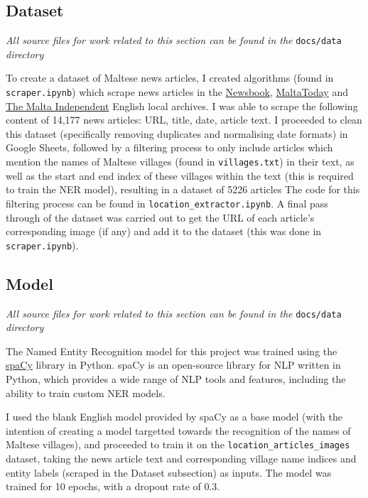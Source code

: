 \documentclass[a4paper, oneside, 11pt]{article}
\begin{document}
\begin{multicols*}{2}
  \subsection{Dataset}
  \textit{All source files for work related to this section can be found in the} \verb|docs/data| \textit{directory}

  \medskip

  To create a dataset of Maltese news articles, I created algorithms (found in \verb|scraper.ipynb|) which scrape news articles in the \href{https://newsbook.com.mt/}{Newsbook}, \href{https://www.maltatoday.com.mt/}{MaltaToday} and \href{https://www.independent.com.mt/}{The Malta Independent} English local archives. I was able to scrape the following content of 14,177 news articles: URL, title, date, article text. I proceeded to clean this dataset (specifically removing duplicates and normalising date formats) in Google Sheets, followed by a filtering process to only include articles which mention the names of Maltese villages (found in \verb|villages.txt|) in their text, as well as the start and end index of these villages within the text (this is required to train the NER model), resulting in a dataset of 5226 articles The code for this filtering process can be found in \verb|location_extractor.ipynb|. A final pass through of the dataset was carried out to get the URL of each article's corresponding image (if any) and add it to the dataset (this was done in \verb|scraper.ipynb|).

  \subsection{Model}
  \textit{All source files for work related to this section can be found in the} \verb|docs/data| \textit{directory}

  \medskip

  The Named Entity Recognition model for this project was trained using the \href{}{spaCy} library in Python. spaCy is an open-source library for NLP written in Python, which provides a wide range of NLP tools and features, including the ability to train custom NER models.

  I used the blank English model provided by spaCy as a base model (with the intention of creating a model targetted towards the recognition of the names of Maltese villages), and proceeded to train it on the \verb|location_articles_images| dataset, taking the news article text and corresponding village name indices and entity labels (scraped in the Dataset subsection) as inputs. The model was trained for 10 epochs, with a dropout rate of 0.3.


\end{multicols*}
\end{document}
